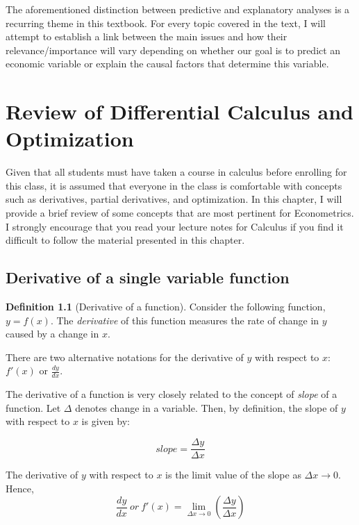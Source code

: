 \documentclass[
]{book}
\theoremstyle{definition}
\newtheorem{definition}{Definition}[chapter]
\theoremstyle{definition}
\theoremstyle{definition}
\theoremstyle{definition}
\theoremstyle{remark}
\begin{document}
The aforementioned distinction between predictive and explanatory analyses is a recurring theme in this textbook. For every topic covered in the text, I will attempt to establish a link between the main issues and how their relevance/importance will vary depending on whether our goal is to predict an economic variable or explain the causal factors that determine this variable.

\hypertarget{review-of-differential-calculus-and-optimization}{%
\chapter{Review of Differential Calculus and Optimization}\label{review-of-differential-calculus-and-optimization}}

Given that all students must have taken a course in calculus before enrolling for this class, it is assumed that everyone in the class is comfortable with concepts such as derivatives, partial derivatives, and optimization. In this chapter, I will provide a brief review of some concepts that are most pertinent for Econometrics. I strongly encourage that you read your lecture notes for Calculus if you find it difficult to follow the material presented in this chapter.

\hypertarget{derivative-of-a-single-variable-function}{%
\section{Derivative of a single variable function}\label{derivative-of-a-single-variable-function}}

\begin{definition}[Derivative of a function]
\protect\hypertarget{def:unnamed-chunk-2}{}\label{def:unnamed-chunk-2}Consider the following function, \(y=f(x)\). The \emph{derivative} of this function measures the rate of change in \(y\) caused by a change in \(x\).
\end{definition}

There are two alternative notations for the derivative of \(y\) with respect to \(x\): \(f'(x)\) or \(\displaystyle{\frac{dy}{dx}}\).

The derivative of a function is very closely related to the concept of \emph{slope} of a function. Let \(\Delta\) denotes change in a variable. Then, by definition, the slope of \(y\) with respect to \(x\) is given by:

\[slope=\frac{\Delta y}{\Delta x}\]

The derivative of \(y\) with respect to \(x\) is the limit value of the slope as \(\Delta x \rightarrow 0\). Hence,
\[\frac{dy}{dx} \ or \ f'(x)=\lim_{\Delta x \to 0} \left( \frac{\Delta y}{\Delta x}\right) \]
\end{document}
